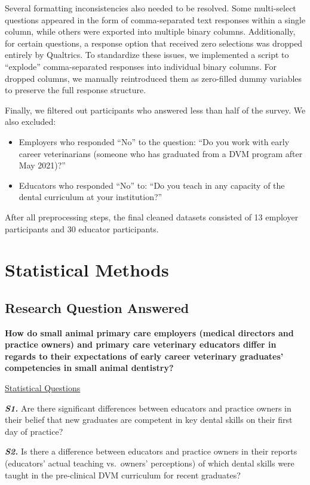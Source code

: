 \documentclass[
  11pt,
  letterpaper,
  DIV=11,
  numbers=noendperiod]{scrartcl}
\begin{document}
Several formatting inconsistencies also needed to be resolved. Some
multi-select questions appeared in the form of comma-separated text
responses within a single column, while others were exported into
multiple binary columns. Additionally, for certain questions, a response
option that received zero selections was dropped entirely by Qualtrics.
To standardize these issues, we implemented a script to ``explode''
comma-separated responses into individual binary columns. For dropped
columns, we manually reintroduced them as zero-filled dummy variables to
preserve the full response structure.

Finally, we filtered out participants who answered less than half of the
survey. We also excluded:

\begin{itemize}
\item
  Employers who responded ``No'' to the question: ``Do you work with
  early career veterinarians (someone who has graduated from a DVM
  program after May 2021)?''
\item
  Educators who responded ``No'' to: ``Do you teach in any capacity of
  the dental curriculum at your institution?''
\end{itemize}

After all preprocessing steps, the final cleaned datasets consisted of
13 employer participants and 30 educator participants.

\section{Statistical Methods}\label{statistical-methods}

\subsection{Research Question
Answered}\label{research-question-answered}

\textbf{How do small animal primary care employers (medical directors
and practice owners) and primary care veterinary educators differ in
regards to their expectations of early career veterinary graduates'
competencies in small animal dentistry?}

\ul{Statistical Questions}

\textbf{\emph{S1.}} Are there significant differences between educators
and practice owners in their belief that new graduates are competent in
key dental skills on their first day of practice?

\textbf{\emph{S2.}} Is there a difference between educators and practice
owners in their reports (educators' actual teaching vs.~owners'
perceptions) of which dental skills were taught in the pre-clinical DVM
curriculum for recent graduates?
\end{document}
